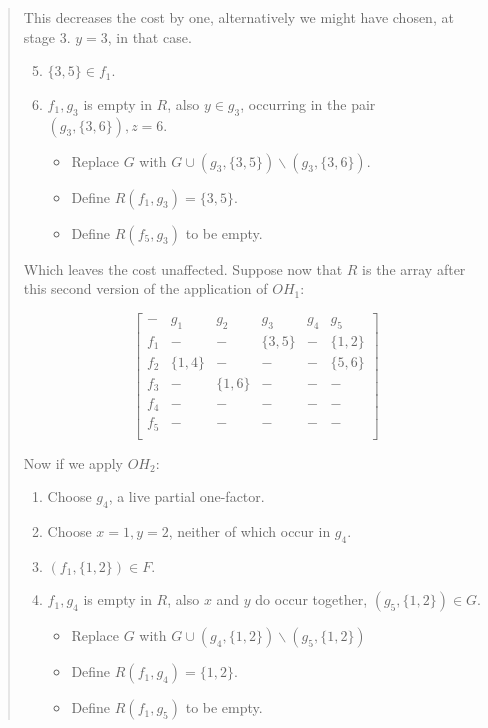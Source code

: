 \documentclass[
  11pt,
  a4paper]{book}
\begin{document}
\begin{quote}
This decreases the cost by one, alternatively we might have
chosen, at stage 3. $y = 3$, in that case.

\begin{enumerate}
  \setcounter{enumi}{4}
  \item{$\{3, 5\} \in f_1$.}
  \item{
    $f_1, g_3$ is empty in $R$, also $y \in g_3$, occurring
      in the pair $(g_3, \{3, 6\}), z = 6$.
    \begin{itemize}
      \item{Replace $G$ with
        $G \cup (g_3, \{3, 5\}) \backslash (g_3, \{3,
        6\})$.}
      \item{Define $R(f_1, g_3) = \{3, 5\}$.}
      \item{Define $R(f_5, g_3)$ to be empty.}
    \end{itemize}
  }
\end{enumerate}

Which leaves the cost unaffected. Suppose now that $R$ is the
array after this second version of the application of $OH_1$:

\begin{equation}
  \begin{bmatrix}
     -  &   g_1    &    g_2    &    g_3   & g_4 &    g_5    \\
    f_1 &     -    &     -     & \{3, 5\} &  -  & \{1, 2\}  \\
    f_2 & \{1, 4\} &     -     &    -     &  -  & \{5, 6\}  \\
    f_3 &     -    &  \{1, 6\} &    -     &  -  &     -     \\
    f_4 &     -    &     -     &    -     &  -  &     -     \\
    f_5 &     -    &     -     &    -     &  -  &     -     \\
  \end{bmatrix}
\end{equation}

Now if we apply $OH_2$:

\begin{enumerate}
  \item{Choose $g_4$, a live partial one-factor.}
  \item{Choose $x = 1, y = 2$, neither of which occur in $g_4$.}
  \item{$(f_1, \{1, 2\}) \in F$.}
  \item{
    $f_1, g_4$ is empty in $R$, also $x$ and $y$ do occur
    together, $(g_5, \{1, 2\}) \in G$.
    \begin{itemize}
      \item{Replace $G$ with
       $G \cup (g_4, \{1, 2\}) \backslash (g_5, \{1, 2\})$}
      \item{Define $R(f_1, g_4) = \{1, 2\}$.}
      \item{Define $R(f_1, g_5)$ to be empty.}
    \end{itemize}
  }
\end{enumerate}


\end{quote}
\end{document}
